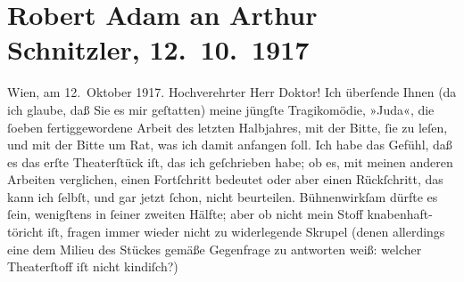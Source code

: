 

         \renewcommand{\erwaehnteInstitutionen}{Institutionen: Burgtheater, Nationaltheater München}
         \renewcommand{\erwaehnteOrte}{Orte: Wien}
         \renewcommand{\erwaehnteWerke}{Werke: Das Ende des Judas}
               \section[Robert Adam an Arthur Schnitzler, 12. 10. 1917]{ Robert Adam an Arthur Schnitzler, 12. 10. 1917}\nopagebreak{}\rehead{ }\begin{ledgroupsized}[t]{13cm}\normalsize\beginnumbering \toendnotes[C]{\smallbreak\pagebreak[2]} 
\pstart
           \raggedleft{}{\pb}Wien, am 12. Oktober
                        1917.\pend
           \pstart{}Hochverehrter Herr Doktor!\pend\pstart
           Ich überſende Ihnen (da ich glaube, daß Sie es mir geſtatten) meine jüngſte
                    Tragikomödie, »Juda«, die ſoeben
                    fertiggewordene Arbeit des letzten Halbjahres, mit der Bitte, ſie zu leſen, und
                    mit der Bitte um Rat, was ich damit anfangen ſoll. Ich habe das Gefühl, daß es
                    das erſte Theaterſtück iſt, das ich geſchrieben habe; ob es, mit meinen anderen
                    Arbeiten verglichen, einen Fortſchritt bedeutet oder aber einen Rückſchritt, das
                    kann ich ſelbſt, und gar jetzt ſchon, nicht beurteilen. Bühnenwirkſam dürfte es
                    ſein, wenigſtens in ſeiner zweiten Hälfte; aber ob nicht mein Stoff {\pb}knabenhaft-töricht iſt, fragen immer wieder
                    nicht zu widerlegende Skrupel (denen allerdings eine dem Milieu des Stückes
                    gemäße Gegenfrage zu antworten weiß: welcher Theaterſtoff iſt nicht kindiſch?)

\end{ledgroupsized}

